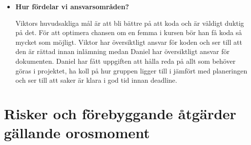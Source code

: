 \documentclass{mall}
\begin{document}
\begin{itemize}
\item \textbf{Hur fördelar vi ansvarsområden?}
  
  Viktors huvudsakliga mål är att bli bättre på att koda och är väldigt duktig på det. För att optimera chansen om en femma i kursen bör han få koda så mycket som möjligt. Viktor har översiktligt ansvar för koden och ser till att den är rättad innan inlämning medan Daniel har översiktligt ansvar för dokumenten. Daniel har fått uppgiften att hålla reda på allt som behöver göras i projektet, ha koll på hur gruppen ligger till i jämfört med planeringen och ser till att saker är klara i god tid innan deadline. 

\end{itemize}

\section{Risker och förebyggande åtgärder gällande orosmoment}
\end{document}
